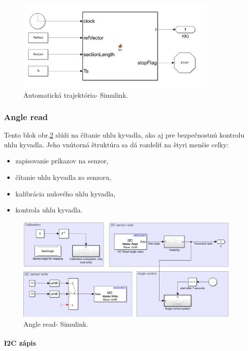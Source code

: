 \begin{figure}[!tbh]
	\centering
	\includegraphics[width=100mm]{obr/AutoSimul.png}
	\caption{Automatická trajektória- Simulink.}\label{OBRAZOK 2.6.66}
\end{figure}

\subsubsection{Angle read}

Tento blok obr.\ref{OBRAZOK 2.6.6} slúži na čítanie uhlu kyvadla, ako aj pre bezpečnostnú kontrolu uhlu kyvadla. Jeho vnútorná štruktúra sa dá rozdeliť na štyri menšie celky: 
\begin{itemize}
	\item zapisovanie príkazov na senzor,  
	\item čítanie uhlu kyvadla zo senzoru, 
	\item kalibrácia nulového uhlu kyvadla,
	\item kontrola uhlu kyvadla. 
\end{itemize}

\begin{figure}[!tbh]
	\centering
	\includegraphics[width=\textwidth]{obr/AngleRead.png}
	\caption{Angle read- Simulink.}\label{OBRAZOK 2.6.6}
\end{figure}


\paragraph{I2C zápis}

